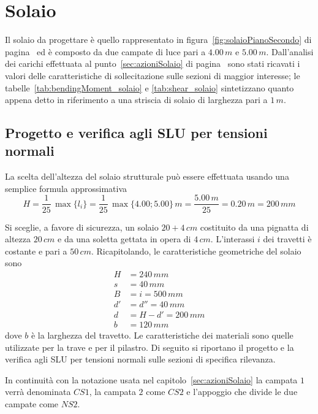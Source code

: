 \cleardoublepage
\chapter{Solaio}\label{chap:solaio}
Il solaio da progettare è quello rappresentato in figura~\ref{fig:solaioPianoSecondo} di pagina~\pageref{fig:solaioPianoSecondo} ed è composto da due campate di luce pari a $4.00\,m$ e $5.00\,m$. Dall'analisi dei carichi effettuata al punto~\ref{sec:azioniSolaio} di pagina~\pageref{sec:azioniSolaio} sono stati ricavati i valori delle caratteristiche di sollecitazione sulle sezioni di maggior interesse; le tabelle~\ref{tab:bendingMoment_solaio} e \ref{tab:shear_solaio} sintetizzano quanto appena detto in riferimento a una striscia di solaio di larghezza pari a $1\,m$.

\section{Progetto e verifica agli SLU per tensioni normali}\label{sec:solaioBendingMoment_slu}

La scelta dell'altezza del solaio strutturale può essere effettuata usando una semplice formula approssimativa
\[
H = \dfrac{1}{25}\,\max\{l_i\} = \dfrac{1}{25}\,\max\{4.00; 5.00\}\,m = \dfrac{5.00\,m}{25} = 0.20\,m = 200\,mm
\]

Si sceglie, a favore di sicurezza, un solaio $20+4\,cm$ costituito da una pignatta di altezza $20\,cm$ e da una soletta gettata in opera di $4\,cm$. L'interassi $i$ dei travetti è costante e pari a $50\,cm$. Ricapitolando, le caratteristiche geometriche del solaio sono
\begin{align*}
    H &= 240\,mm\\
	s &= 40\,mm\\
	B &= i = 500\,mm\\ 
	d' &= d'' = 40\,mm\\
	d &= H - d' = 200\,mm\\
	b &= 120\,mm
\end{align*}
dove $b$ è la larghezza del travetto. Le caratteristiche dei materiali sono quelle utilizzate per la trave e per il pilastro. Di seguito si riportano il progetto e la verifica agli SLU per tensioni normali sulle sezioni di specifica rilevanza.

In continuità con la notazione usata nel capitolo~\ref{sec:azioniSolaio} la campata $1$ verrà denominata $CS1$, la campata $2$ come $CS2$ e l'appoggio che divide le due campate come $NS2$.


